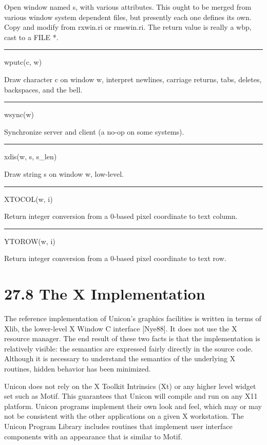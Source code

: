 Open window named s, with various attributes. This ought to be merged
from various window system dependent files, but presently each one
defines its own. Copy and modify from \textsf{rxwin.ri} or
\textsf{rmswin.ri}. The return value is really a \textsf{wbp}, cast to
a \textsf{FILE *}.


\bigskip\hrule\vspace{0.1cm}
\noindent
wputc(c, w)


Draw character \textsf{c} on window \textsf{w}, interpret newlines,
carriage returns, tabs, deletes, backspaces, and the bell.


\bigskip\hrule\vspace{0.1cm}
\noindent
wsync(w)


Synchronize server and client (a no-op on some systems).


\bigskip\hrule\vspace{0.1cm}
\noindent
xdis(w, s, s\_len)


Draw string s on window \textsf{w}, low-level.


\bigskip\hrule\vspace{0.1cm}
\noindent
XTOCOL(w, i)


Return integer conversion from a 0-based pixel coordinate to text column.


\bigskip\hrule\vspace{0.1cm}
\noindent
YTOROW(w, i)


Return integer conversion from a 0-based pixel coordinate to text row.

\section[27.8 The X Implementation]{27.8 The X Implementation}

The reference implementation of Unicon's graphics facilities is
written in terms of Xlib, the lower-level X Window C interface
[Nye88]. It does not use the X resource manager. The end result of
these two facts is that the implementation is relatively visible: the
semantics are expressed fairly directly in the source code. Although
it is necessary to understand the semantics of the underlying X
routines, hidden behavior has been minimized.

Unicon does not rely on the X Toolkit Intrinsics (Xt) or any higher
level widget set such as Motif. This guarantees that Unicon will
compile and run on any X11 platform. Unicon programs implement their
own look and feel, which may or may not be consistent with the other
applications on a given X workstation. The Unicon Program Library
includes routines that implement user interface components with an
appearance that is similar to Motif.

